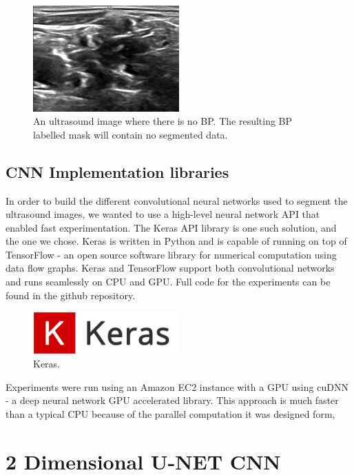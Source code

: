 \documentclass[letterpaper]{article}
\begin{document}
 \begin{figure}[H]
  \centerline{\includegraphics[width=0.5\textwidth]{Images/1_5NoNerve.png}}
  \caption{An ultrasound image where there is no BP. The resulting BP labelled mask will contain no segmented data.}
  \label{fig:BPMask}
\end{figure}

\subsection{CNN Implementation libraries}
In order to build the different convolutional neural networks used to segment the ultrasound images, we wanted to use a high-level neural network API that enabled fast experimentation. The Keras API library is one such solution, and the one we chose. Keras is written in Python and is capable of running on top of TensorFlow - an open source software library for numerical computation using data flow graphs. Keras and TensorFlow support both convolutional networks and runs seamlessly on CPU and GPU. Full code for the experiments can be found in the github repository. \cite{githubrepo}

 \begin{figure}[H]
  \centerline{\includegraphics[width=0.5\textwidth]{Images/Keras.png}}
  \caption{Keras.}
  \label{fig:keras}
\end{figure}

Experiments were run using an Amazon EC2 instance with a GPU using cuDNN - a deep neural network GPU accelerated library. This approach is much faster than a typical CPU because of the parallel computation it was designed form,

\section{2 Dimensional U-NET CNN}
\end{document}
